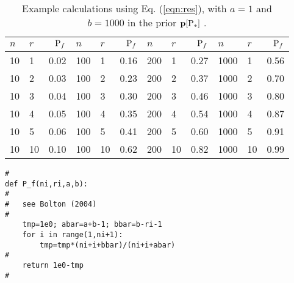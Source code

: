 \documentclass[11pt]{article}
\begin{document}
\begin{table}[!h]
\centering
\caption{\label{tab:exp}Example calculations using Eq. (\ref{eqn:res}), with $a=1$ and $b=1000$ in the prior $\p[\P_\ast]$ . }
\begin{tabular}{ll|r|ll|r|ll|r|ll|r|}
$n$  & $r$  & $\P_f$  & $n$   & $r$  & $\P_f$  & $n$    & $r$  & $\P_f$ & $n$    & $r$  & $\P_f$  \\
\hline
10 & 1  & 0.02  & 100 & 1  & 0.16 &  200 & 1  & 0.27  &  1000 & 1  & 0.56\\
10 & 2  & 0.03  & 100 & 2  & 0.23 &  200 & 2  & 0.37 &  1000 & 2  & 0.70 \\
10 & 3  & 0.04 & 100 & 3  & 0.30 &  200 & 3  & 0.46  &  1000 & 3  & 0.80\\
10 & 4  & 0.05  & 100 & 4  & 0.35 &  200 & 4  & 0.54 &  1000 & 4  & 0.87 \\
10 & 5  & 0.06  & 100 & 5  & 0.41 &  200 & 5  & 0.60  &  1000 & 5  & 0.91 \\
10 & 10 & 0.10 & 100 & 10 & 0.62 &  200 & 10 & 0.82 &  1000 & 10 & 0.99
\end{tabular}
\end{table}

\begin{verbatim}
#
def P_f(ni,ri,a,b):
#
#   see Bolton (2004)
#
    tmp=1e0; abar=a+b-1; bbar=b-ri-1
    for i in range(1,ni+1):
        tmp=tmp*(ni+i+bbar)/(ni+i+abar)
#
    return 1e0-tmp
#
\end{verbatim}

 
 
\end{document}
